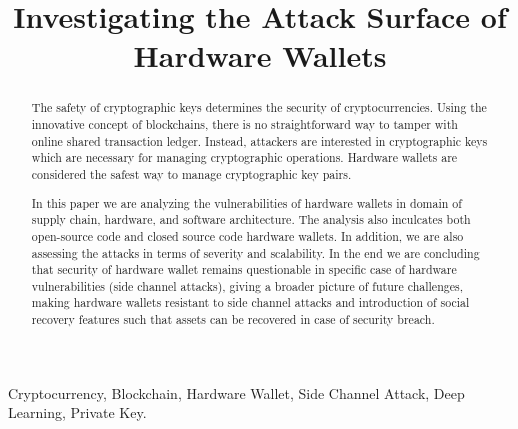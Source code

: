 \documentclass[conference]{IEEEtran}
\begin{document}
\title{Investigating the Attack Surface of Hardware Wallets}

\author{
}

\maketitle


\begin{abstract}
The safety of cryptographic keys determines the security of cryptocurrencies. Using the innovative concept of blockchains, there is no 
straightforward way to tamper with online shared transaction ledger. Instead, attackers are interested in cryptographic keys which are 
necessary for managing cryptographic operations. Hardware wallets are considered the safest way to manage cryptographic key pairs.  

In this paper we are analyzing the vulnerabilities of hardware wallets in domain of supply chain, hardware, and software architecture. 
The analysis also inculcates both open-source code and closed source code hardware wallets. In addition, we are also assessing the attacks 
in terms of severity and scalability. In the end we are concluding that security of hardware wallet remains questionable in specific case 
of hardware vulnerabilities (side channel attacks), giving a broader picture of future challenges, making hardware wallets resistant to 
side channel attacks and introduction of social recovery features such that assets can be recovered in case of security breach.
\end{abstract}

\begin{IEEEkeywords}
Cryptocurrency, Blockchain, Hardware Wallet, Side Channel Attack, Deep Learning, Private Key.  
\end{IEEEkeywords}

\end{document}
